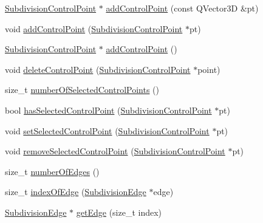 \begin{DoxyCompactItemize}
\item 
\hyperlink{classShipCAD_1_1SubdivisionControlPoint}{Subdivision\-Control\-Point} $\ast$ \hyperlink{classShipCAD_1_1SubdivisionSurface_af644edd0d4ba993dbab280f036b37171}{add\-Control\-Point} (const Q\-Vector3\-D \&pt)
\item 
void \hyperlink{classShipCAD_1_1SubdivisionSurface_a7ac8b717bcb728da2334cc2f16c8b428}{add\-Control\-Point} (\hyperlink{classShipCAD_1_1SubdivisionControlPoint}{Subdivision\-Control\-Point} $\ast$pt)
\item 
\hyperlink{classShipCAD_1_1SubdivisionControlPoint}{Subdivision\-Control\-Point} $\ast$ \hyperlink{classShipCAD_1_1SubdivisionSurface_a7eccf33cb39ef12f56553352da34da62}{add\-Control\-Point} ()
\item 
void \hyperlink{classShipCAD_1_1SubdivisionSurface_ad4f874132a137e89a39e60572748dab0}{delete\-Control\-Point} (\hyperlink{classShipCAD_1_1SubdivisionControlPoint}{Subdivision\-Control\-Point} $\ast$point)
\item 
size\-\_\-t \hyperlink{classShipCAD_1_1SubdivisionSurface_ac15e844f2feb644d71b1de3a886f6970}{number\-Of\-Selected\-Control\-Points} ()
\item 
bool \hyperlink{classShipCAD_1_1SubdivisionSurface_aafd696ac2c5353ac5593acdbe8b1fb2e}{has\-Selected\-Control\-Point} (\hyperlink{classShipCAD_1_1SubdivisionControlPoint}{Subdivision\-Control\-Point} $\ast$pt)
\item 
void \hyperlink{classShipCAD_1_1SubdivisionSurface_a65cc43d93da8ed72af631e893057c773}{set\-Selected\-Control\-Point} (\hyperlink{classShipCAD_1_1SubdivisionControlPoint}{Subdivision\-Control\-Point} $\ast$pt)
\item 
void \hyperlink{classShipCAD_1_1SubdivisionSurface_a5be891c06dc5e441511fbdb73d71efeb}{remove\-Selected\-Control\-Point} (\hyperlink{classShipCAD_1_1SubdivisionControlPoint}{Subdivision\-Control\-Point} $\ast$pt)
\item 
size\-\_\-t \hyperlink{classShipCAD_1_1SubdivisionSurface_a74c607d9835c69a00b7730fad5384037}{number\-Of\-Edges} ()
\item 
size\-\_\-t \hyperlink{classShipCAD_1_1SubdivisionSurface_aa3d68eacb2fafd9dab6d40c3230ed991}{index\-Of\-Edge} (\hyperlink{classShipCAD_1_1SubdivisionEdge}{Subdivision\-Edge} $\ast$edge)
\item 
\hyperlink{classShipCAD_1_1SubdivisionEdge}{Subdivision\-Edge} $\ast$ \hyperlink{classShipCAD_1_1SubdivisionSurface_a67e69fc54ca38627596efc49b6d82e7f}{get\-Edge} (size\-\_\-t index)
\item 

\end{DoxyCompactItemize}
